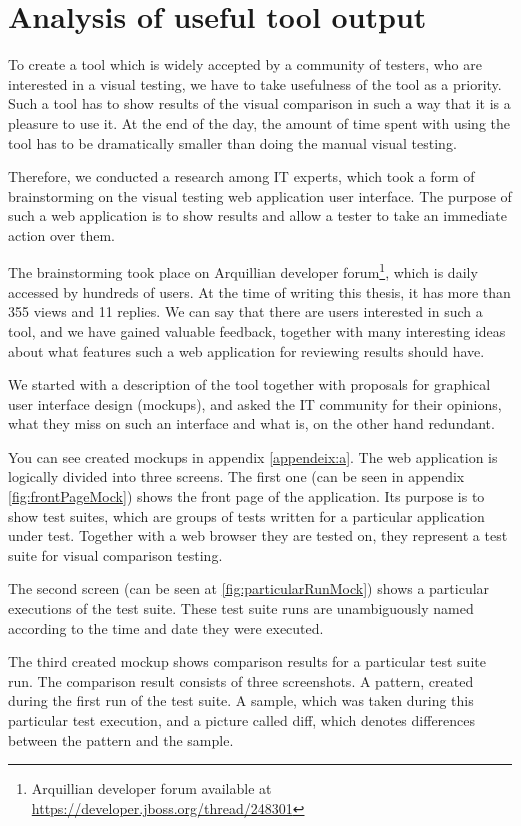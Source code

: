\documentclass[11pt,oneside,final]{fithesis2}
\begin{document}
  \newpage
  \section{Analysis of useful tool output}
  \label{sec:analysisUsefulOutput}
  To create a tool which is widely accepted by a community of testers, who are interested in a visual testing, we have to take usefulness of the tool as a priority. Such a tool has to show results
  of the visual comparison in such a way that it is a pleasure to use it. At the end of the day, the amount of time spent with using the tool has to be dramatically smaller than doing the manual
  visual testing.
   
  Therefore, we conducted a research among IT experts, which took a form of brainstorming on the visual testing web application user interface. The purpose of such a web application is to show
  results and allow a tester to take an immediate action over them.
  
  The brainstorming took place on Arquillian developer forum\footnote{Arquillian developer forum available at \url{https://developer.jboss.org/thread/248301}}, which is daily accessed by hundreds of users. At the time of writing this thesis, it has more than 355 views 
  and 11 replies. We can say that there are users interested in such a tool, and we have gained valuable feedback, together with many interesting ideas about what features such a web application
  for reviewing results should have.
  
  We started with a description of the tool together with proposals for graphical user interface design (mockups), and asked the IT community for their
  opinions, what they miss on such an interface and what is, on the other hand redundant.
  
  You can see created mockups in appendix \ref{appendeix:a}. The web application is logically divided into
  three screens. The first one (can be seen in appendix \ref{fig:frontPageMock}) shows the front page of the application. Its purpose
  is to show test suites, which are groups of tests written for a particular application under test.
  Together with a web browser they are tested on, they represent a test suite for visual comparison testing.
  
  The second screen (can be seen at \ref{fig:particularRunMock}) shows a particular executions of the test suite. These test
  suite runs are unambiguously named according to the time and date they were executed.
  
  The third created mockup shows comparison results for a particular test suite run. The comparison result
  consists of three screenshots. A pattern, created during the first run of the test suite. A sample, which
  was taken during this particular test execution, and a picture called diff, which denotes differences
  between the pattern and the sample.
  
\end{document}
